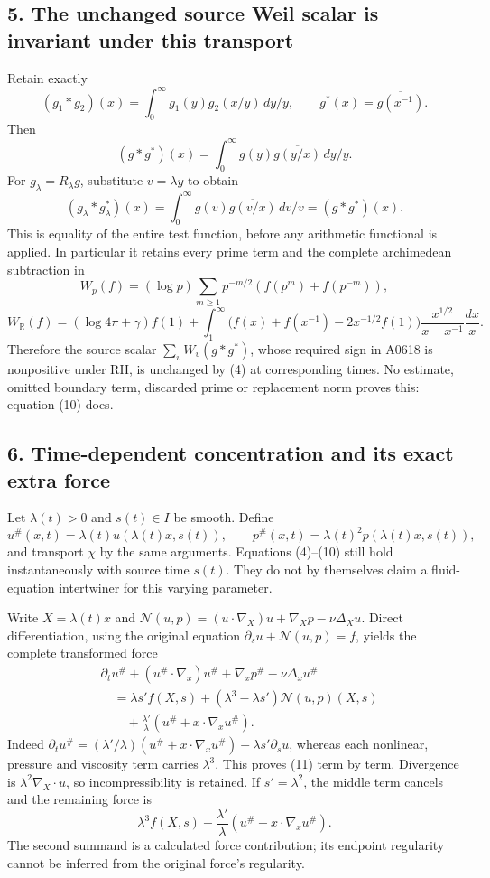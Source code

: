 \documentclass[10pt,a4paper,oneside]{report}
\begin{document}
\subsection{5. The unchanged source Weil scalar is invariant under this
transport}\label{proof09:the-unchanged-source-weil-scalar-is-invariant-under-this-transport}

Retain exactly \[
(g_1*g_2)(x)=\int_0^\infty g_1(y)g_2(x/y)\,dy/y,
\qquad g^*(x)=\overline{g(x^{-1})}.
\] Then \[
(g*g^*)(x)=\int_0^\infty g(y)\overline{g(y/x)}\,dy/y.
\] For \(g_\lambda=R_\lambda g\), substitute \(v=\lambda y\) to obtain
\[
\boxed{(g_\lambda*g_\lambda^*)(x)=\int_0^\infty g(v)\overline{g(v/x)}\,dv/v=(g*g^*)(x).}
\tag{10}
\] This is equality of the entire test function, before any arithmetic
functional is applied. In particular it retains every prime term and the
complete archimedean subtraction in \[
W_p(f)=(\log p)\sum_{m\ge1}p^{-m/2}(f(p^m)+f(p^{-m})),
\] \[
W_{\mathbb R}(f)=(\log4\pi+\gamma)f(1)+
\int_1^\infty\bigl(f(x)+f(x^{-1})-2x^{-1/2}f(1)\bigr)
\frac{x^{1/2}}{x-x^{-1}}\frac{dx}{x}.
\] Therefore the source scalar \(\sum_vW_v(g*g^*)\), whose required sign
in A0618 is nonpositive under RH, is unchanged by (4) at corresponding
times. No estimate, omitted boundary term, discarded prime or
replacement norm proves this: equation (10) does.

\subsection{6. Time-dependent concentration and its exact extra
force}\label{proof09:time-dependent-concentration-and-its-exact-extra-force}

Let \(\lambda(t)>0\) and \(s(t)\in I\) be smooth. Define \[
u^\#(x,t)=\lambda(t)u(\lambda(t)x,s(t)),\qquad
p^\#(x,t)=\lambda(t)^2p(\lambda(t)x,s(t)),
\] and transport \(\chi\) by the same arguments. Equations (4)--(10)
still hold instantaneously with source time \(s(t)\). They do not by
themselves claim a fluid-equation intertwiner for this varying
parameter.

Write \(X=\lambda(t)x\) and
\(\mathcal N(u,p)= (u\cdot\nabla_X)u+\nabla_Xp-\nu\Delta_Xu\). Direct
differentiation, using the original equation
\(\partial_su+\mathcal N(u,p)=f\), yields the complete transformed force
\[
\boxed{\begin{aligned}
&\partial_tu^\#+(u^\#\cdot\nabla_x)u^\#+\nabla_xp^\#-\nu\Delta_xu^\#\\
&\quad=\lambda s'f(X,s)+(\lambda^3-\lambda s')\mathcal N(u,p)(X,s)\\
&\qquad+\frac{\lambda'}{\lambda}(u^\#+x\cdot\nabla_xu^\#).
\end{aligned}}
\tag{11}
\] Indeed
\(\partial_tu^\#=(\lambda'/\lambda)(u^\#+x\cdot\nabla_xu^\#)+\lambda s'\partial_su\),
whereas each nonlinear, pressure and viscosity term carries
\(\lambda^3\). This proves (11) term by term. Divergence is
\(\lambda^2\nabla_X\cdot u\), so incompressibility is retained. If
\(s'=\lambda^2\), the middle term cancels and the remaining force is \[
\lambda^3 f(X,s)+\frac{\lambda'}{\lambda}(u^\#+x\cdot\nabla_xu^\#).
\tag{12}
\] The second summand is a calculated force contribution; its endpoint
regularity cannot be inferred from the original force's regularity.
\end{document}

